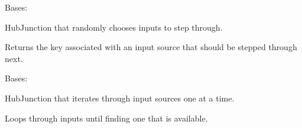 \documentclass[letterpaper,10pt,english]{sphinxmanual}
\begin{document}
\begin{fulllineitems}
\label{\detokenize{Fireworks:Fireworks.toolbox.junctions.RandomHubJunction}}
Bases: {\hyperref[\detokenize{Fireworks:Fireworks.toolbox.junctions.HubJunction}]{}}

HubJunction that randomly chooses inputs to step through.

\begin{fulllineitems}
\label{\detokenize{Fireworks:Fireworks.toolbox.junctions.RandomHubJunction.sample_inputs}}
Returns the key associated with an input source that should be stepped through next.

\end{fulllineitems}


\end{fulllineitems}


\begin{fulllineitems}
\label{\detokenize{Fireworks:Fireworks.toolbox.junctions.ClockworkHubJunction}}
Bases: {\hyperref[\detokenize{Fireworks:Fireworks.toolbox.junctions.HubJunction}]{}}

HubJunction that iterates through input sources one at a time.

\begin{fulllineitems}
\label{\detokenize{Fireworks:Fireworks.toolbox.junctions.ClockworkHubJunction.reset}}
\end{fulllineitems}


\begin{fulllineitems}
\label{\detokenize{Fireworks:Fireworks.toolbox.junctions.ClockworkHubJunction.sample_inputs}}
Loops through inputs until finding one that is available.

\end{fulllineitems}


\end{fulllineitems}
\end{document}
